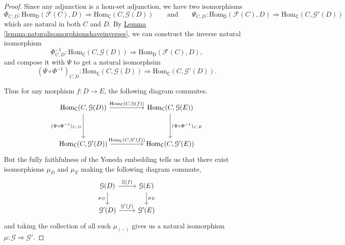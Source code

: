 \documentclass[a4paper]{report}
\newcommand{\Hom}{\mathrm{Hom}}
\theoremstyle{definition}
\theoremstyle{plain}
\theoremstyle{remark}
\begin{document}
\begin{proof}
  Since any adjunction is a hom-set adjunction, we have two isomorphisms
  \begin{equation*}
    \Phi_{C, D}\colon \Hom_{\mathsf{D}}(\mathcal{F}(C), D) \Rightarrow \Hom_{\mathsf{C}}(C, \mathcal{G}(D))\qquad\text{and}\qquad \Psi_{C, D}\colon \Hom_{\mathsf{D}}(\mathcal{F}(C), D) \Rightarrow \Hom_{\mathsf{C}}(C, \mathcal{G}'(D))
  \end{equation*}
  which are natural in both $C$ and $D$. By \hyperref[lemma:naturalisomorphismshaveinverses]{Lemma \ref*{lemma:naturalisomorphismshaveinverses}}, we can construct the inverse natural isomorphism
  \begin{equation*}
    \Phi^{-1}_{C, D}\colon \Hom_{\mathsf{C}}(C, \mathcal{G}(D)) \Rightarrow \Hom_{\mathsf{D}}(\mathcal{F}(C), D),
  \end{equation*}
  and compose it with $\Psi$ to get a natural isomorphsim
  \begin{equation*}
    (\Psi \circ \Phi^{-1})_{C, D}\colon \Hom_{\mathsf{C}}(C, \mathcal{G}(D)) \Rightarrow \Hom_{\mathsf{C}}(C, \mathcal{G}'(D)).
  \end{equation*}

  Thus for any morphism $f\colon D \to E$, the following diagram commutes.
  \begin{equation*}
    \begin{tikzcd}[row sep=huge, column sep=huge]
      \Hom_{\mathsf{C}}(C, \mathcal{G}(D))
      \arrow[r, "{\Hom_{\mathsf{C}}(C, \mathcal{G}(f))}"]
      \arrow[d, swap, "{(\Psi \circ \Phi^{-1})_{C, D}}"]
      & \Hom_{\mathsf{C}}(C, \mathcal{G}(E))
      \arrow[d, "{(\Psi \circ \Phi^{-1})_{C, E}}"]
      \\
      \Hom_{\mathsf{C}}(C, \mathcal{G}'(D))
      \arrow[r, "{\Hom_{\mathsf{C}}(C, \mathcal{G}'(f))}"]
      & \Hom_{\mathsf{C}}(C, \mathcal{G}'(E))
    \end{tikzcd}
  \end{equation*}
  But the fully faithfulness of the Yoneda embedding tells us that there exist isomorphisms $\mu_{D}$ and $\mu_{E}$ making the following diagram commute,
  \begin{equation*}
    \begin{tikzcd}
      \mathcal{G}(D)
      \arrow[r, "\mathcal{G}(f)"]
      \arrow[d, swap, "\mu_{D}"]
      & \mathcal{G}(E)
      \arrow[d, "\mu_{E}"]
      \\
      \mathcal{G}'(D)
      \arrow[r, "\mathcal{G}'(f)"]
      & \mathcal{G}'(E)
    \end{tikzcd}
  \end{equation*}
  and taking the collection of all such $\mu_{(-)}$ gives us a natural isomorphism $\mu\colon \mathcal{G} \Rightarrow \mathcal{G}'$.
\end{proof}
\end{document}

